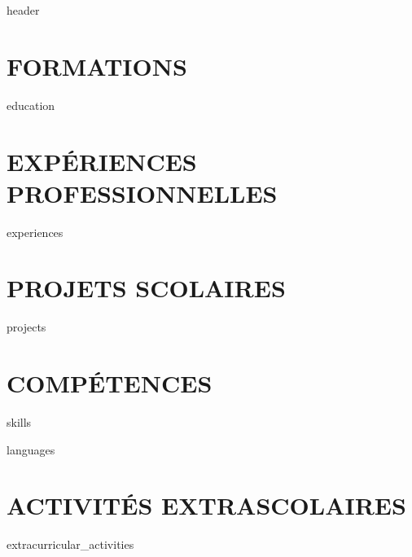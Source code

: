 \documentclass[letterpaper,11pt]{article}
\newcommand{\resumeSubHeadingListStart}{\begin{itemize}[leftmargin=0.0in, label={}]}
\newcommand{\resumeSubHeadingListEnd}{\end{itemize}}
\begin{document}

\vspace*{1pt}

{{ header }}

\section{\MakeUppercase{Formations}}
    \resumeSubHeadingListStart

        {{ education }}
        
    \resumeSubHeadingListEnd

\section{\MakeUppercase{Expériences professionnelles}}
    \resumeSubHeadingListStart

        {{ experiences }}

    \resumeSubHeadingListEnd

\vspace{-16pt}

\section{\MakeUppercase{Projets scolaires}}

    \vspace{-5pt}

    \resumeSubHeadingListStart

        {{ projects }}

    \resumeSubHeadingListEnd
    
\vspace{-8pt}

\section{\MakeUppercase{Compétences}}
 \begin{itemize}[leftmargin=0.0in, label={}]
    \small
     
     {{ skills }}

     {{ languages }}

 \end{itemize}
 \vspace{-16pt}


\section{\MakeUppercase{Activités extrascolaires}}

    {{ extracurricular_activities }}
\end{document}
